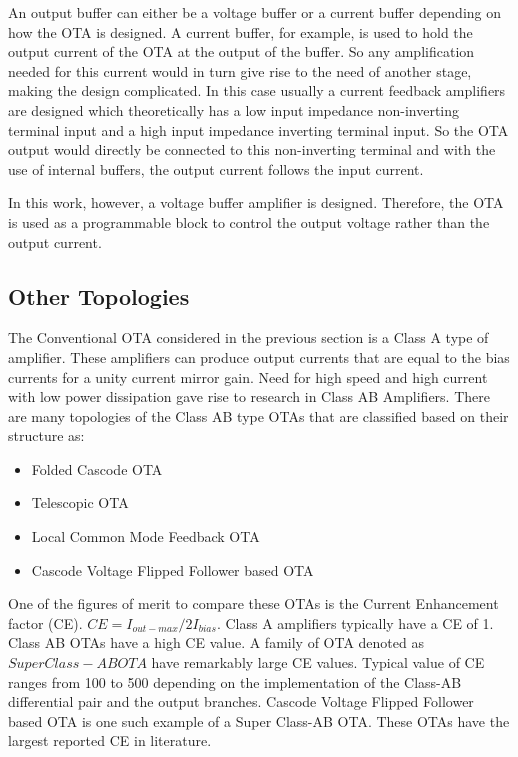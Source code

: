 An output buffer can either be a voltage buffer or a current buffer depending on how the OTA is designed. A current buffer, for example, is used to hold the output current of the OTA at the output of the buffer. So any amplification needed for this current would in turn give rise to the need of another stage, making the design complicated. In this case usually a current feedback amplifiers are designed which theoretically has a low input impedance non-inverting terminal input and a high input impedance inverting terminal input. So the OTA output would directly be connected to this non-inverting terminal and with the use of internal buffers, the output current follows the input current.

In this work, however, a voltage buffer amplifier is designed. Therefore, the OTA is used as a programmable block to control the output voltage rather than the output current.

\subsection{Other Topologies}
The Conventional OTA considered in the previous section is a Class A type of amplifier. These amplifiers can produce output currents that are equal to the bias currents for a unity current mirror gain. Need for high speed and high current with low power dissipation gave rise to research in Class AB Amplifiers. There are many topologies of the Class AB type OTAs that are classified based on their structure as:
\begin{itemize}
\item Folded Cascode OTA
\item Telescopic OTA
\item Local Common Mode Feedback OTA
\item Cascode Voltage Flipped Follower based OTA
\end{itemize}

One of the figures of merit to compare these OTAs is the Current Enhancement factor (CE). $CE = I_{out-max}/2I_{bias}$. Class A amplifiers typically have a CE of 1. Class AB OTAs have a high CE value. A family of OTA denoted as $Super Class-AB OTA$ have remarkably large CE values. Typical value of CE ranges from 100 to 500 depending on the implementation of the Class-AB differential pair and the output branches. Cascode Voltage Flipped Follower based OTA is one such example of a Super Class-AB OTA. These OTAs have the largest reported CE in literature.

